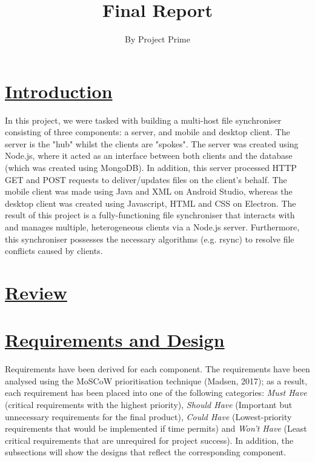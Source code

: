 \documentclass{article}
\title{Final Report}
\author{By Project Prime}
\begin{document}
 \maketitle
 \section{\underline{Introduction}}
In this project, we were tasked with building a multi-host file synchroniser consisting of three components: a server, and mobile and desktop client. The server is the "hub" whilst the clients are "spokes". The server was created using Node.js, where it acted as an interface between both clients and the database (which was created using MongoDB). In addition, this server processed HTTP GET and POST requests to deliver/updates files on the client's behalf. The mobile client was made using Java and XML on Android Studio, whereas the desktop client was created using Javascript, HTML and CSS on Electron. The result of this project is a fully-functioning file synchroniser that interacts with and manages multiple, heterogeneous clients via a Node.js server. Furthermore, this synchroniser possesses the necessary algorithms (e.g. rsync) to resolve file conflicts caused by clients. 

\section{\underline{Review}}

\section{\underline{Requirements and Design}}
Requirements have been derived for each component. The requirements have been analysed using the MoSCoW prioritisation technique (Madsen, 2017); as a result, each requirement has been placed into one of the following categories: \textit{Must Have} (critical requirements with the highest priority), \textit{Should Have} (Important but unnecessary requirements for the final product), \textit{Could Have} (Lowest-priority requirements that would be implemented if time permits) and \textit{Won't Have} (Least critical requirements that are unrequired for project success). In addition, the subsections will show the designs that reflect the corresponding component.
\end{document}
